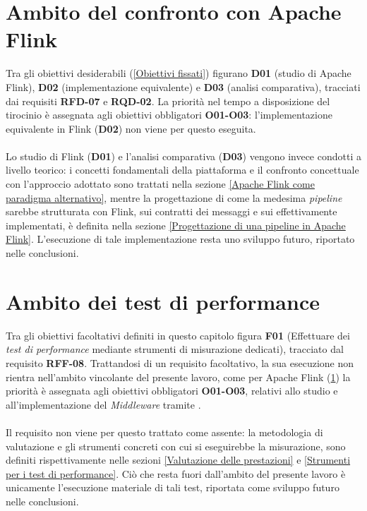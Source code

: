 \section{Ambito del confronto con Apache Flink}
\label{Ambito del confronto con Apache Flink}
Tra gli obiettivi desiderabili (\ref{Obiettivi fissati}) figurano \textbf{D01} (studio di Apache Flink), \textbf{D02} (implementazione equivalente) e \textbf{D03} (analisi comparativa), tracciati dai requisiti \textbf{RFD-07} e \textbf{RQD-02}. La priorità nel tempo a disposizione del tirocinio è assegnata agli obiettivi obbligatori \textbf{O01-O03}: l'implementazione equivalente in Flink (\textbf{D02}) non viene per questo eseguita. \\ \\
Lo studio di Flink (\textbf{D01}) e l'analisi comparativa (\textbf{D03}) vengono invece condotti a livello teorico: i concetti fondamentali della piattaforma e il confronto concettuale con l'approccio  adottato sono trattati nella sezione \ref{Apache Flink come paradigma alternativo}, mentre la progettazione di come la medesima \textit{pipeline} sarebbe strutturata con Flink, sui contratti dei messaggi e sui \textit{} effettivamente implementati, è definita nella sezione \ref{Progettazione di una pipeline in Apache Flink}. 
L'esecuzione di tale implementazione resta uno sviluppo futuro, riportato nelle conclusioni.

\section{Ambito dei test di performance}
\label{Ambito dei test di performance}
Tra gli obiettivi facoltativi definiti in questo capitolo figura \textbf{F01} (Effettuare dei \textit{test di performance} mediante strumenti di misurazione dedicati), tracciato dal requisito \textbf{RFF-08}. 
Trattandosi di un requisito facoltativo, la sua esecuzione non rientra nell'ambito vincolante del presente lavoro, come per Apache Flink (\ref{Ambito del confronto con Apache Flink}) la priorità è assegnata agli obiettivi obbligatori \textbf{O01-O03}, relativi allo studio e all'implementazione del \textit{Middleware} tramite . \\ \\
Il requisito non viene per questo trattato come assente: la metodologia di valutazione e gli strumenti concreti con cui si eseguirebbe la misurazione, sono definiti rispettivamente nelle sezioni \ref{Valutazione delle prestazioni} e \ref{Strumenti per i test di performance}. 
Ciò che resta fuori dall'ambito del presente lavoro è unicamente l'esecuzione materiale di tali test, riportata come sviluppo futuro nelle conclusioni.

\newpage
